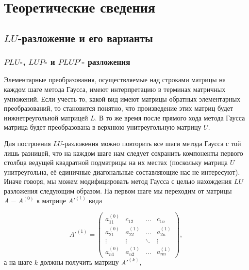 \section{Теоретические сведения}

\subsection{$LU$-разложение и его варианты}
\subsubsection{$PLU$-, $LUP$- и $PLUP'$- разложения}

Элементарные преобразования, осуществляемые над строками матрицы на каждом шаге метода Гаусса, имеют интерпретацию в терминах матричных умножений. Если учесть то, какой вид имеют матрицы обратных элементарных преобразований, то становится понятно, что произведение этих матриц будет нижнетреугольной матрицей $L$. В то же время после прямого хода метода Гаусса матрица будет преобразована в верхнюю унитреугольную матрицу $U$.

Для построения $LU$-разложения можно повторить все шаги метода Гаусса с той лишь разницей, что на каждом шаге нам следует сохранить компоненты первого столбца ведущей квадратной подматрицы на их местах (поскольку матрица $U$ унитреугольна, её единичные диагональные составляющие нас не интересуют). Иначе говоря, мы можем модифицировать метод Гаусса с целью нахождения $LU$ разложения следующим образом. На первом шаге мы переходим от матрицы $A = A^{(0)}$ к матрице $A'^{(1)}$ вида

\[
A'^{ (1) } = 
	\begin{pmatrix}
		a_{11}^{ (0) } & c_{12}			& \hdots & c_{1n}			\\
		a_{21}^{ (0) } & a_{22}^{ (1) } & \hdots & a_{2n}^{ (1) }	\\
		\vdots		   & \vdots			& \ddots & \vdots			\\
		a_{n1}^{ (0) } & a_{n2}^{ (1) } & \hdots & a_{nn}^{ (1) } 	
	\end{pmatrix},
\]
а на шаге $k$ должны получить матрицу $A'^{ (k) }$, 

